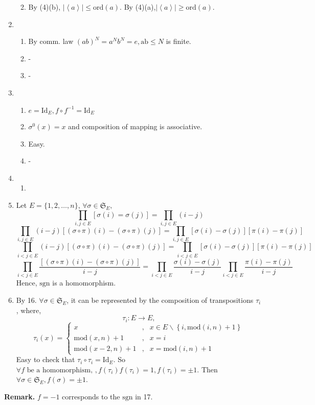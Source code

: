 \documentclass[12pt]{article}
\begin{document}
\begin{enumerate}
\begin{enumerate}
\begin{enumerate}
                \end{enumerate}
            \item By (4)(b), $\left|\left \langle a \right \rangle \right|\le \mathrm{ord}(a)$. By (4)(a),$\left|\left \langle a \right \rangle \right|\ge \mathrm{ord}(a)$.
        \end{enumerate}
    \item 
        \begin{enumerate}
            \item By comm. law $(ab)^{N}=a^N b^N=e, \mathrm{ab}\le N$ is finite.
            \item -
            \item -
        \end{enumerate}
    \item 
        \begin{enumerate}
            \item $e=\mathrm{Id}_E,f\circ f^{-1}=\mathrm{Id}_E$
            \item $\sigma^0(x)=x$ and composition of mapping is associative.
            \item Easy.
            \item -
        \end{enumerate}
    \item 
        \begin{enumerate}
            \item 
        \end{enumerate}
    \item Let $E=\{1,2,\dots,n\}$, $\forall \sigma\in \mathfrak{S}_E,$
            $$\prod_{i,j\in E}[\sigma(i)=\sigma(j)]=\prod_{i,j\in E}(i-j)$$
            $$\prod_{i,j\in E}(i-j)[(\sigma\circ \pi) (i)-(\sigma\circ\pi)(j)]=\prod_{i,j\in E}[\sigma(i)-\sigma(j)][\pi(i)-\pi(j)]$$
            $$\prod_{i<j\in E}(i-j)[(\sigma\circ \pi) (i)-(\sigma\circ\pi)(j)]=\prod_{i<j\in E}[\sigma(i)-\sigma(j)][\pi(i)-\pi(j)]$$
            $$\prod_{i<j\in E}\frac{[(\sigma\circ \pi) (i)-(\sigma\circ\pi)(j)]}{i-j}=\prod_{i<j\in E}\frac{\sigma(i)-\sigma(j)}{i-j}\prod_{i<j\in E}\frac{\pi(i)-\pi(j)}{i-j}$$
            Hence, $\mathrm{sgn}$ is a homomorphism.
    \item By 16. $\forall \sigma \in \mathfrak{S}_E$, it can be represented by the composition of transpositions $\tau_i$, where,
        $$\tau_i: E\longrightarrow E,$$$$ \tau_i(x)=
        \left\{\begin{matrix}
        x&,&x\in E\backslash \left \{ i,\mathrm{mod} (i ,n)+1\right \} \\
        \mathrm{mod}(x,n)+1&,&x=i \\
        \mathrm{mod}( x-2,n)+1&,&x=\mathrm{mod}(i,n)+1
        \end{matrix}\right.$$
        Easy to check that $\tau_i\circ\tau_i=\mathrm{Id}_E$. So $\forall f \text{ be a homomorphism, },f(\tau_i)f(\tau_i)=1,f(\tau_i)=\pm 1$. Then $\forall \sigma \in \mathfrak{S}_E, f(\sigma)=\pm1$.
\end{enumerate}
\textbf{Remark.  }$f=-1$ corresponds to the $\mathrm{sgn}$ in 17.
\end{document}
